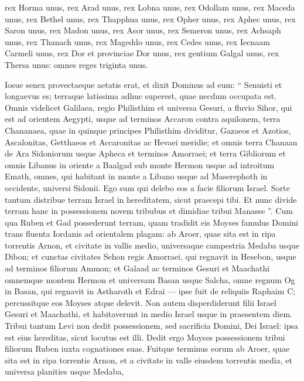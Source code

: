 \begin{biblechapter}
\begin{biblechapter}
\begin{biblechapter}
\begin{biblechapter}
\begin{biblechapter}
\begin{biblechapter}
\begin{biblechapter}
\begin{biblechapter}
\begin{biblechapter}
\begin{biblechapter}
\begin{biblechapter}
\begin{biblechapter}
\verse rex Horma unus, rex Arad unus, 
\verse rex Lobna unus, rex Odollam unus, 
\verse rex Maceda unus, rex Bethel unus, 
\verse rex Thapphua unus, rex Opher unus, 
\verse rex Aphec unus, rex Saron unus, 
\verse rex Madon unus, rex Asor unus, 
 \verse rex Semeron unus, rex Achsaph unus, 
\verse rex Thanach unus, rex Mageddo unus, 
\verse rex Cedes unus, rex Iecnaam Carmeli unus, 
\verse rex Dor et provinciae Dor unus, rex gentium Galgal unus, 
\verse rex Thersa unus: omnes reges triginta unus.
 
\begin{biblechapter}
\verse Iosue senex provectaeque aetatis erat, et dixit Dominus ad eum: “ Senuisti et longaevus es; terraque latissima adhuc superest, quae necdum occupata est. 
\verse Omnis videlicet Galilaea, regio Philisthim et universa Gesuri, 
\verse a fluvio Sihor, qui est ad orientem Aegypti, usque ad terminos Accaron contra aquilonem, terra Chananaea, quae in quinque principes Philisthim dividitur, Gazaeos et Azotios, Ascalonitas, Getthaeos et Accaronitas ac Hevaei 
 \verse meridie; et omnis terra Chanaan de Ara Sidoniorum usque Apheca et terminos Amorraei; 
\verse et terra Gibliorum et omnis Libanus in oriente a Baalgad sub monte Hermon usque ad introitum Emath, 
\verse omnes, qui habitant in monte a Libano usque ad Maserephoth in occidente, universi Sidonii. Ego sum qui delebo eos a facie filiorum Israel. Sorte tantum distribue terram Israel in hereditatem, sicut praecepi tibi. 
\verse Et nunc divide terram hanc in possessionem novem tribubus et dimidiae tribui Manasse ”.
 \verse Cum qua Ruben et Gad possederunt terram, quam tradidit eis Moyses famulus Domini trans fluenta Iordanis ad orientalem plagam: 
\verse ab Aroer, quae sita est in ripa torrentis Arnon, et civitate in vallis medio, universaque campestria Medaba usque Dibon; 
\verse et cunctas civitates Sehon regis Amorraei, qui regnavit in Hesebon, usque ad terminos filiorum Ammon; 
\verse et Galaad ac terminos Gesuri et Maachathi omnemque montem Hermon et universam Basan usque Salcha, 
\verse omne regnum Og in Basan, qui regnavit in Astharoth et Edrai — ipse fuit de reliquiis Raphaim C; percussitque eos Moyses atque delevit. 
\verse Non autem disperdiderunt filii Israel Gesuri et Maachathi, et habitaverunt in medio Israel usque in praesentem diem.
 \verse Tribui tantum Levi non dedit possessionem, sed sacrificia Domini, Dei Israel: ipsa est eius hereditas, sicut locutus est illi.
 \verse Dedit ergo Moyses possessionem tribui filiorum Ruben iuxta cognationes suas. 
\verse Fuitque terminus eorum ab Aroer, quae sita est in ripa torrentis Arnon, et a civitate in valle eiusdem torrentis media, et universa planities usque Medaba, 

\end{biblechapter}
\end{biblechapter}
\end{biblechapter}
\end{biblechapter}
\end{biblechapter}
\end{biblechapter}
\end{biblechapter}
\end{biblechapter}
\end{biblechapter}
\end{biblechapter}
\end{biblechapter}
\end{biblechapter}
\end{biblechapter}
